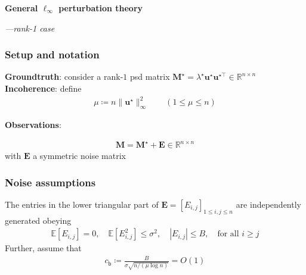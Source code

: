 \documentclass[compress,
mathserif,wide,%
]{beamer}
\begin{document}
\begin{frame}[plain]
\vfill
\centering
{\large \bf General $\ell_{\infty}$ perturbation theory}

{\hfill \em ---rank-1 case}
\vfill
\end{frame}

%
\begin{frame}
	\frametitle{Setup and notation}
	{\bf Groundtruth}: consider a rank-$1$ psd matrix $\bm{M}^{\star} = \lambda^{\star} \bm{u}^{\star} \bm{u}^{\star\top}\in \mathbb{R}^{n\times n}$   \\
	
	\vspace{1em}
	{\bf Incoherence}: define
	\begin{align*}
	\mu \coloneqq {n\|\bm{u}^{\star}\|_{\infty}^{2}} \qquad (1 \leq \mu \leq n)
\end{align*}

	\vspace{1em}
	{\bf Observations}: 
	
	\begin{align*}
	\bm{M}=\bm{M}^{\star}+\bm{E} \in \mathbb{R}^{n\times n}
\end{align*}
with $\bm{E}$ a symmetric noise matrix
\end{frame}


\begin{frame}
	\frametitle{Noise assumptions}


	The entries in the lower triangular part of $\bm{E}=[E_{i,j}]_{1\leq i,j\leq n}$ are independently generated obeying
%
\begin{align*}
	\mathbb{E}[E_{i,j}] = 0, \quad \mathbb{E}[E_{i,j}^2]\leq \sigma^2, \quad |E_{i,j}|\leq B, \quad \text{for all }i\geq j
\end{align*}
%
	Further,  assume that 
	\begin{align*}
		c_{\mathsf{b}} \coloneqq \frac{B}{  \sigma  \sqrt{n/(\mu\log n)} } = O(1)
	\end{align*}
	
\end{frame}
\end{document}
